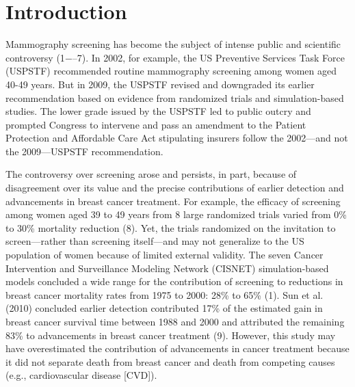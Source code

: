 \documentclass[11pt,letterpaper]{article}
\theoremstyle{plain}
\theoremstyle{remark}
\numberwithin{equation}{section}
\begin{document}

\thispagestyle{empty}
\setcounter{page}{0}
\newpage
\clearpage
\section{Introduction}
Mammography screening has become the subject of intense public and
scientific controversy (1$-–$7). In 2002, for example, the US Preventive
Services Task Force (USPSTF) recommended routine mammography screening
among women aged 40-49 years.  But in 2009, the USPSTF revised and
downgraded its earlier recommendation based on evidence from
randomized trials and simulation-based studies.  The lower grade
issued by the USPSTF led to public outcry and prompted Congress to
intervene and pass an amendment to the Patient Protection and
Affordable Care Act stipulating insurers follow the 2002—and not the
2009—USPSTF recommendation.  

The controversy over screening arose and persists, in part, because of
disagreement over its value and the precise contributions of earlier
detection and advancements in breast cancer treatment.  For example,
the efficacy of screening among women aged 39 to 49 years from 8 large
randomized trials varied from 0\% to 30\% mortality reduction (8).
Yet, the trials randomized on the invitation to screen—rather than
screening itself—and may not generalize to the US population of women
because of limited external validity.  The seven Cancer Intervention
and Surveillance Modeling Network (CISNET) simulation-based models
concluded a wide range for the contribution of screening to reductions
in breast cancer mortality rates from 1975 to 2000: 28\% to 65\% (1).
Sun et al. (2010) concluded earlier detection contributed 17\% of the
estimated gain in breast cancer survival time between 1988 and 2000
and attributed the remaining 83\% to advancements in breast cancer
treatment (9).  However, this study may have overestimated the
contribution of advancements in cancer treatment because it did not
separate death from breast cancer and death from competing causes
(e.g., cardiovascular disease [CVD]).  
\end{document}

